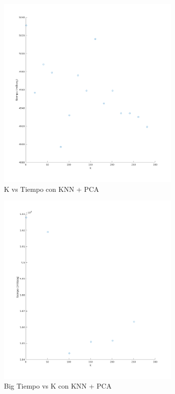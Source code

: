 \begin{figure}[H]
	\centering	\includegraphics[width=0.8\textwidth]{img/k_pca_tiempo.png}
	\caption{K vs Tiempo con KNN + PCA}
	\label{fig:K vs Tiempo con KNN + PCA}
\end{figure}
\begin{figure}[H]
	\centering	\includegraphics[width=0.8\textwidth]{img/big_k_pca_tiempo.png}
	\caption{Big Tiempo vs K con KNN + PCA}
	\label{fig:Big K vs Tiempo con KNN + PCA}
\end{figure}



